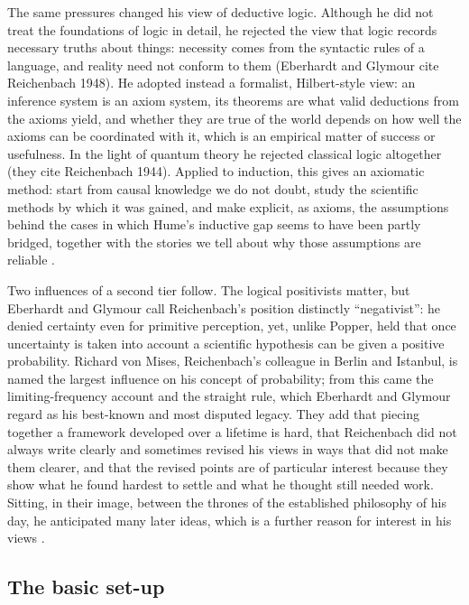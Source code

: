 The same pressures changed his view of deductive logic. Although he did
not treat the foundations of logic in detail, he rejected the view that
logic records necessary truths about things: necessity comes from the
syntactic rules of a language, and reality need not conform to them (Eberhardt and Glymour cite Reichenbach 1948). He adopted instead a formalist,
Hilbert-style view: an inference system is an axiom system, its theorems
are what valid deductions from the axioms yield, and whether they are
true of the world depends on how well the axioms can be coordinated with
it, which is an empirical matter of success or usefulness. In the light
of quantum theory he rejected classical logic altogether (they cite
Reichenbach 1944). Applied to induction, this gives an axiomatic method:
start from causal knowledge we do not doubt, study the scientific
methods by which it was gained, and make explicit, as axioms, the
assumptions behind the cases in which Hume's inductive gap seems to have
been partly bridged, together with the stories we tell about why those
assumptions are reliable \cite[pp.~358--359]{EberhardtGlymour2011ReichenbachReading}.

Two influences of a second tier follow. The logical positivists matter,
but Eberhardt and Glymour call Reichenbach's position distinctly ``negativist'':
he denied certainty even for primitive perception, yet, unlike Popper,
held that once uncertainty is taken into account a scientific hypothesis
can be given a positive probability. Richard von Mises, Reichenbach's
colleague in Berlin and Istanbul, is named the largest influence on his
concept of probability; from this came the limiting-frequency account
and the straight rule, which Eberhardt and Glymour regard as his best-known and
most disputed legacy. They add that piecing together a framework
developed over a lifetime is hard, that Reichenbach did not always write
clearly and sometimes revised his views in ways that did not make them
clearer, and that the revised points are of particular interest because
they show what he found hardest to settle and what he thought still
needed work. Sitting, in their image, between the thrones of the
established philosophy of his day, he anticipated many later ideas, which
is a further reason for interest in his views
\cite[pp.~359--360]{EberhardtGlymour2011ReichenbachReading}.

\subsection{The basic set-up}
\label{sec:p15-w02b-p15-030-eg-setup}

